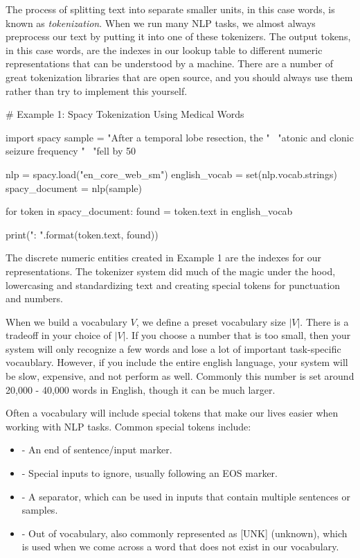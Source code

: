 The process of splitting text into separate smaller units, in this case words, is known as \textit{tokenization}.
When we run many NLP tasks, we almost always preprocess our text by putting it into one of these tokenizers.
The output tokens, in this case words, are the indexes in our lookup table to different numeric representations that can be understood by a machine.
There are a number of great tokenization libraries that are open source, and you should always use them rather than try to implement this yourself.

\begin{python}
  # Example 1: Spacy Tokenization Using Medical Words

  import spacy
  sample = "After a temporal lobe resection, the " \
           "atonic and clonic seizure frequency " \
           "fell by 50%

  nlp = spacy.load("en_core_web_sm")
  english_vocab = set(nlp.vocab.strings)
  spacy_document = nlp(sample)

  for token in spacy_document:
      found = token.text in english_vocab

      print("{}: {}".format(token.text, found))
\end{python}

The discrete numeric entities created in Example 1 are the indexes for our representations.
The tokenizer system did much of the magic under the hood, lowercasing and standardizing text and creating special tokens for punctuation and numbers.

When we build a vocabulary $V$, we define a preset vocabulary size $|V|$. There is a tradeoff in your choice of $|V|$.
If you choose a number that is too small, then your system will only recognize a few words and lose a lot of important task-specific vocaublary.
However, if you include the entire english language, your system will be slow, expensive, and not perform as well.
Commonly this number is set around 20,000 - 40,000 words in English, though it can be much larger.

Often a vocabulary will include special tokens that make our lives easier when working with NLP tasks.
Common special tokens include:
\begin{itemize}
  \item \pythoninline{[EOS]} - An end of sentence/input marker.
  \item \pythoninline{[PAD]} - Special inputs to ignore, usually following an EOS marker.
  \item \pythoninline{[SEP]} - A separator, which can be used in inputs that contain multiple sentences or samples.
  \item \pythoninline{[OOV]} - Out of vocabulary, also commonly represented as [UNK] (unknown), which is used when we come across a word that does not exist in our vocabulary.
\end{itemize}

